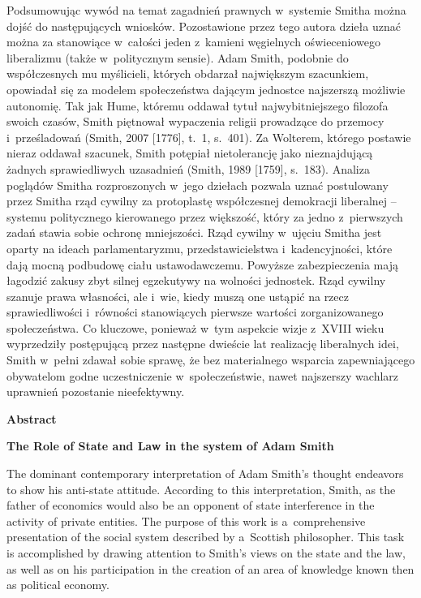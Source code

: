 Podsumowując wywód na temat zagadnień prawnych w~systemie Smitha można dojść do następujących wniosków. Pozostawione przez tego autora dzieła uznać można za stanowiące w~całości jeden z~kamieni węgielnych oświeceniowego liberalizmu (także w~politycznym sensie). Adam Smith, podobnie do współczesnych mu myślicieli, których obdarzał największym szacunkiem, opowiadał się za modelem społeczeństwa dającym jednostce najszerszą możliwie autonomię. Tak jak Hume, któremu oddawał tytuł najwybitniejszego filozofa swoich czasów, Smith piętnował wypaczenia religii prowadzące do przemocy i~prześladowań \label{ref:RNDWdGETBWW27}(Smith, 2007 [1776], t.~1, s.~401). Za Wolterem, którego postawie nieraz oddawał szacunek, Smith potępiał nietolerancję jako nieznajdującą żadnych sprawiedliwych uzasadnień \label{ref:RNDcOFI1QT8Tr}(Smith, 1989 [1759], s.~183). Analiza poglądów Smitha rozproszonych w~jego dziełach pozwala uznać postulowany przez Smitha rząd cywilny za protoplastę współczesnej demokracji liberalnej -- systemu politycznego kierowanego przez większość, który za jedno z~pierwszych zadań stawia sobie ochronę mniejszości. Rząd cywilny w~ujęciu Smitha jest oparty na ideach parlamentaryzmu, przedstawicielstwa i~kadencyjności, które dają mocną podbudowę ciału ustawodawczemu. Powyższe zabezpieczenia mają łagodzić zakusy zbyt silnej egzekutywy na wolności jednostek. Rząd cywilny szanuje prawa własności, ale i~wie, kiedy muszą one ustąpić na rzecz sprawiedliwości i~równości stanowiących pierwsze wartości zorganizowanego społeczeństwa. Co kluczowe, ponieważ w~tym aspekcie wizje z~XVIII wieku wyprzedziły postępującą przez następne dwieście lat realizację liberalnych idei, Smith w~pełni zdawał sobie sprawę, że bez materialnego wsparcia zapewniającego obywatelom godne uczestniczenie w~społeczeństwie, nawet najszerszy wachlarz uprawnień pozostanie nieefektywny.

{\bfseries
Abstract}

{\bfseries
The Role of State and Law in the system of Adam Smith}

The dominant contemporary interpretation of Adam Smith's thought endeavors to show his anti-state attitude. According to this interpretation, Smith, as the father of economics would also be an opponent of state interference in the activity of private entities. The purpose of this work is a~comprehensive presentation of the social system described by a~Scottish philosopher. This task is accomplished by drawing attention to Smith's views on the state and the law, as well as on his participation in the creation of an area of knowledge known then as political economy.

